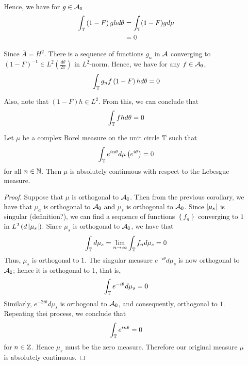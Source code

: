 Hence, we have for $g \in {\cal A}_{0}$
\begin{align*}
    \int_{\mathbb T} \left( 1-F \right) gh d\theta &= \int_{\mathbb T} (1-F)g d\mu  \\
    &= 0
\end{align*}

Since $\overline{A} = H^{2}$. There is a sequence of functions ${g_{n}}$ in ${\cal A}$ converging to $\left( 1-F \right)^{-1} \in L^{2} \left( \frac{d\theta}{2\pi} \right)$ in $L^{2}$-norm. Hence, we have for any $f\in {\cal A}_{0}$,
\begin{equation*}
    \int_{\mathbb T} g_{n}f\left( 1-F \right)h d\theta = 0
\end{equation*}


Also, note that $\left( 1-F \right)h \in L^{2}$. From this, we can conclude that 
\begin{equation*}
    \int_{\mathbb T} fh d\theta = 0
\end{equation*}

\begin{theorem}
    Let $\mu$ be a complex Borel measure on the unit circle $\mathbb T$ such that
    \begin{equation*}
	\int_{\mathbb T} e^{in\theta} d\mu \left( e^{i\theta} \right) =0
    \end{equation*}
    for all $n\in\mathbb N$. Then $\mu$ is absolutely continuous with respect to the Lebesgue measure.
    \label{thm:f-and-m-riesz}
\end{theorem}
\begin{proof}
    Suppose that $\mu$ is orthogonal to ${\cal A}_{0}$. Then from the previous corollary, we have that $\mu_{a}$ is orthogonal to ${\cal A}_{0}$ and $\mu_{s}$ is orthogonal to ${\cal A}_{0}$. Since $\left\lvert \mu_{s} \right\rvert$ is singular (definition?), we can find a sequence of functions $\left\{ f_{n} \right\}$ converging to $1$ in $L^{2} \left( d\left\lvert \mu_{s} \right\rvert \right)$. Since $\mu_{s}$ is orthogonal to ${\cal A}_{0}$, we have that
    \begin{equation*}
	\int_{\mathbb T} d\mu_{s} = \lim_{n\to \infty} \int_{\mathbb T} f_{n} d\mu_{s} = 0
    \end{equation*}
    Thus, $\mu_{s}$ is orthogonal to $1$. The singular measure $e^{-i\theta} d\mu_{s}$ is now orthogonal to ${\cal A}_{0}$; hence it is orthogonal to $1$, that is, 
    \begin{equation*}
    \int_{\mathbb T} e^{-i\theta} d\mu_{s} = 0
    \end{equation*}
    Similarly, $e^{-2i\theta} d\mu_{s}$ is orthogonal to ${\cal A}_{0}$, and consequently, orthogonal to $1$. Repeating thei process, we conclude that
    \begin{equation*}
	\int_{\mathbb T} e^{in\theta} = 0
    \end{equation*}
    for $n\in \mathbb Z$.
    Hence $\mu_{s}$ must be the zero measure. Therefore our original measure $\mu$ is absolutely continuous. 
\end{proof}
